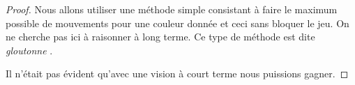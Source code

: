\begin{proof}
    Nous allons utiliser une méthode simple consistant à faire le maximum possible de mouvements pour une couleur donnée et ceci sans bloquer le jeu. On ne cherche pas ici à raisonner à long terme. Ce type de méthode est dite \emph{\itshape \og gloutonne \fg}.

\begin{mvts}
    \medskip
    \item  {}

    \medskip
    \item  {}

    \medskip
    \item  {}

    \medskip
    \item  {}

    \medskip
    \item  {}

    \medskip
    \item  {}

    \medskip
    \item  {}

    \medskip
    \item  {}

    \medskip
    \item  {}
\end{mvts}

Il n'était pas évident qu'avec une vision à court terme nous puissions gagner.
\end{proof}
